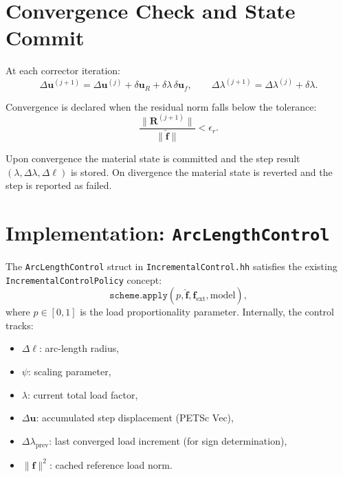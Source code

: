 \section{Convergence Check and State Commit}
\label{sec:arc-converge}

At each corrector iteration:
\begin{equation}
  \Delta\mathbf{u}^{(j+1)} = \Delta\mathbf{u}^{(j)}
    + \delta\mathbf{u}_R + \delta\lambda \, \delta\mathbf{u}_f,
  \qquad
  \Delta\lambda^{(j+1)} = \Delta\lambda^{(j)} + \delta\lambda.
\end{equation}

Convergence is declared when the residual norm falls below the
tolerance:
\begin{equation}
  \label{eq:arc-tol}
  \frac{\|\mathbf{R}^{(j+1)}\|}{\|\hat{\mathbf{f}}\|} < \epsilon_r.
\end{equation}

Upon convergence the material state is committed and the step result
$(\lambda, \Delta\lambda, \Delta\ell)$ is stored.  On divergence the
material state is reverted and the step is reported as failed.


\section{Implementation: \texttt{ArcLengthControl}}
\label{sec:arc-control-impl}

The \texttt{ArcLengthControl} struct in \texttt{IncrementalControl.hh}
satisfies the existing \texttt{IncrementalControlPolicy} concept:
\begin{equation*}
  \texttt{scheme.apply}(p, \hat{\mathbf{f}},
  \mathbf{f}_{\text{ext}}, \text{model}),
\end{equation*}
where $p \in [0, 1]$ is the load proportionality parameter.
Internally, the control tracks:
\begin{itemize}
  \item $\Delta\ell$: arc-length radius,
  \item $\psi$: scaling parameter,
  \item $\lambda$: current total load factor,
  \item $\Delta\mathbf{u}$: accumulated step displacement (PETSc Vec),
  \item $\Delta\lambda_{\text{prev}}$: last converged load increment
        (for sign determination),
  \item $\|\hat{\mathbf{f}}\|^2$: cached reference load norm.
\end{itemize}

